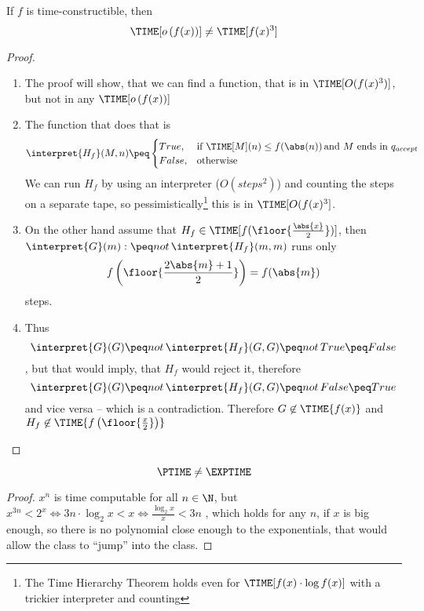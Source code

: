 \begin{theorem}
	If $f$ is time-constructible, then
	\[ \TIME[o\left(f(x)\right)] \neq \TIME[f(x)^3] \]
\end{theorem}
\begin{proof}
	\begin{enumerate}
		\item The proof will show, that we can find a function, that is in 
			$\TIME[O(f(x)^3)]$, but not in any $\TIME[o\left(f(x)\right)]$
		\item The function that does that is 
			\[ \interpret{H_f}(M, n) \peq \begin{cases}
					True, &\text{if }\TIME[M](n) \leq f(\abs(n))\,\text{and $M$ ends in $q_{accept}$}\\
					False, &\text{otherwise}
			\end{cases} \]
			We can run $H_f$ by using an interpreter ($O(steps^2)$) and counting the steps on a 
			separate tape, so pessimistically\footnote{The Time Hierarchy Theorem 
			holds even for $\TIME[f(x)\cdot\log f(x)]$ with a trickier interpreter
			and counting} this is in $\TIME[O(f(x)^3]$. 
		\item On the other hand assume that $H_f\in \TIME[f(\floor{\frac{\abs{x}}{2}})]$, 
			then $\interpret{G}(m) :\peq not\,\interpret{H_f}(m, m)$ runs only
			\[f\left(\floor{\frac{2\abs{m}+1}{2}}\right)=f(\abs{m})\] steps. 
		\item Thus 
			\[\interpret{G}(G)\peq not\, \interpret{H_f}(G,G) \peq not\, True \peq False\]
			, but that would imply, that $H_f$ would reject it, therefore 
			\[\interpret{G}(G)\peq not\, \interpret{H_f}(G,G) \peq not\, False \peq True\]
			and vice versa -- which is a contradiction. Therefore $G\not\in\TIME{f(x)}$ 
			and $H_f\not\in\TIME{f\left(\floor{\frac{x}{2}}\right)}$
	\end{enumerate}
\end{proof}

\begin{corrolary}
	\[\PTIME\neq\EXPTIME\]
\end{corrolary}
\begin{proof}
	$x^n$ is time computable for all $n\in \N$, but 
	$x^{3n} < 2^x \Leftrightarrow 3n\cdot \log_2 x < x \Leftrightarrow \frac{\log_2 x}{x} < 3n$
	, which holds for any $n$, if $x$ is big enough, so there is no polynomial 
	close enough to the exponentials, that would allow the \PTIME\/ class to 
	``jump'' into the \EXPTIME\/ class.
\end{proof}

